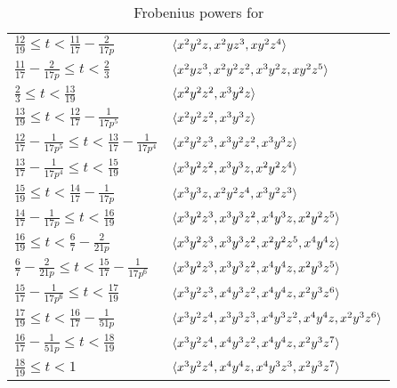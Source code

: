 \documentclass{amsart}
\begin{document}
\begin{example}
{\begin{table}
\begin{tabular}{ll}
        $\frac{12}{19} \le t < \frac{11}{17} - \frac2{17 p}$ & $\langle x^2y^2z, x^2yz^3, xy^2z^4 \rangle$ \\
        $\frac{11}{17} - \frac2{17 p} \le t < \frac23$ & $\langle x^2yz^3, x^2y^2z^2, x^3y^2z, xy^2z^5 \rangle$ \\
        $\frac23 \le t < \frac{13}{19}$ & $\langle x^2y^2z^2, x^3y^2z \rangle$ \\
        $\frac{13}{19} \le t < \frac{12}{17} - \frac1{17 p^5}$ & $\langle x^2y^2z^2, x^3y^3z \rangle$ \\
        $\frac{12}{17} - \frac1{17 p^5} \le t < \frac{13}{17} - \frac1{17 p^4}$ & $\langle x^2y^2z^3, x^3y^2z^2, x^3y^3z \rangle$ \\
        $\frac{13}{17} - \frac1{17 p^4} \le t < \frac{15}{19}$ & $\langle x^3y^2z^2, x^3y^3z, x^2y^2z^4 \rangle$ \\
        $\frac{15}{19} \le t < \frac{14}{17} - \frac1{17 p}$ & $\langle x^3y^3z, x^2y^2z^4, x^3y^2z^3 \rangle$ \\
        $\frac{14}{17} - \frac1{17 p} \le t < \frac{16}{19}$ & $\langle x^3y^2z^3, x^3y^3z^2, x^4y^3z, x^2y^2z^5 \rangle$ \\
        $\frac{16}{19} \le t < \frac67 - \frac2{21 p}$ & $\langle x^3y^2z^3, x^3y^3z^2, x^2y^2z^5, x^4y^4z \rangle$ \\
        $\frac67 - \frac2{21 p} \le t < \frac{15}{17} - \frac1{17 p^6}$ & $\langle x^3y^2z^3, x^3y^3z^2, x^4y^4z, x^2y^3z^5 \rangle$ \\
        $\frac{15}{17} - \frac1{17 p^6} \le t < \frac{17}{19}$ & $\langle x^3y^2z^3, x^4y^3z^2, x^4y^4z, x^2y^3z^6 \rangle$ \\
        $\frac{17}{19} \le t < \frac{16}{17} - \frac1{51 p}$ & $\langle x^3y^2z^4, x^3y^3z^3, x^4y^3z^2, x^4y^4z, x^2y^3z^6 \rangle$ \\
        $\frac{16}{17} - \frac1{51 p} \le t < \frac{18}{19}$ & $\langle x^3y^2z^4, x^4y^3z^2, x^4y^4z, x^2y^3z^7 \rangle$ \\
        $\frac{18}{19} \le t < 1$ & $\langle x^3y^2z^4, x^4y^4z, x^4y^3z^3, x^2y^3z^7 \rangle$ \\
        \bottomrule
      \end{tabular}
      \endgroup
   \caption{Frobenius powers for }
   \label{table: main example}
\end{table}
\clearpage
}
\end{example}
\end{document}
